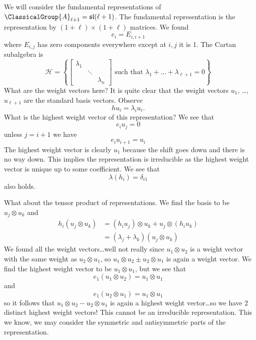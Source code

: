 We will consider the fundamental representations of
$\ClassicalGroup{A}_{\ell+1}=\mathfrak{sl}(\ell+1)$. The
fundamental representation is the representation by
$(1+\ell)\times(1+\ell)$ matrices. We found
\begin{equation}
e_{i}=E_{i,i+1}
\end{equation}
where $E_{i,j}$ has zero components everywhere except at $i,j$ it
is 1. The Cartan subalgebra is
\begin{equation}
\mathscr{H}=\left\{\begin{bmatrix}\lambda_1 & & \\
 & \ddots & \\
 &        & \lambda_{n}
\end{bmatrix}\text{ such that }\lambda_{1}+\dots+\lambda_{\ell+1}=0\right\}
\end{equation}
What are the weight vectors here? It is quite clear that the
weight vectors $u_{1}$, \dots, $u_{\ell+1}$ are the standard
basis vectors. Observe
\begin{equation}
hu_{i}=\lambda_{i}u_{i}.
\end{equation}
What is the highest weight vector of this representation? We see
that
\begin{equation}
e_{i}u_{j} = 0
\end{equation}
unless $j=i+1$ we have
\begin{equation}
e_{i}u_{i+1}=u_{i}
\end{equation}
The highest weight vector is clearly $u_{1}$ because the shift
goes down and there is no way down. This implies the
representation is irreducible as the highest weight vector is
unique up to some coefficient. We see that
\begin{equation}
\lambda(h_{i}) = \delta_{i1}
\end{equation}
also holds.

What about the tensor product of representations. We find the
basis to be $u_{j}\otimes u_{k}$ and
\begin{subequations}
\begin{align}
h_{i}(u_{j}\otimes u_{k}) &= (h_{i}u_{j})\otimes u_{k} + u_{j}\otimes(h_{i}u_{k})\\
&= (\lambda_{j}+\lambda_{k})(u_{j}\otimes u_{k})
\end{align}
\end{subequations}
We found all the weight vectors\dots well not really since
$u_{1}\otimes u_{2}$ is a weight vector with the same weight as
$u_{2}\otimes u_{1}$, so $u_{1}\otimes u_{2}\pm u_{2}\otimes
u_{1}$ is again a weight vector. We find the highest weight
vector to be $u_{1}\otimes u_{1}$, but we see that
\begin{equation}
e_{1}(u_{1}\otimes u_{2}) = u_{1}\otimes u_{1}
\end{equation}
and
\begin{equation}
e_{1}(u_{2}\otimes u_{1}) = u_{1}\otimes u_{1}
\end{equation}
so it follows that $u_{1}\otimes u_{2}-u_{2}\otimes u_{1}$ is
again a highest weight vector\dots so we have 2 distinct highest
weight vectors! This cannot be an irreducible
representation. This we know, we may consider the symmetric and
antisymmetric parts of the representation.



